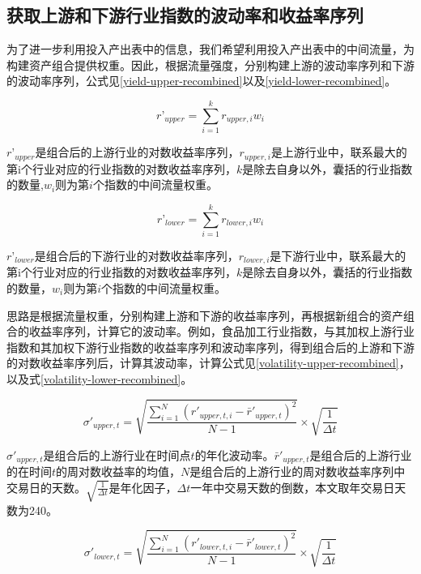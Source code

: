 \documentclass{sysuthesis}
\begin{document}
\subsection{获取上游和下游行业指数的波动率和收益率序列}
为了进一步利用投入产出表中的信息，我们希望利用投入产出表中的中间流量，为构建资产组合提供权重。因此，根据流量强度，分别构建上游的波动率序列和下游的波动率序列，公式见\ref{yield-upper-recombined}以及\ref{yield-lower-recombined}。

\begin{equation}
\label{yield-upper-recombined} 
{r’_{upper}} = \sum\limits_{i = 1}^k {{r_{upper,i}}{w_i}} 
\end{equation}

${r’_{upper}}$是组合后的上游行业的对数收益率序列，${r_{upper,i}}$是上游行业中，联系最大的第i个行业对应的行业指数的对数收益率序列，$k$是除去自身以外，囊括的行业指数的数量,${w_i}$则为第$i$个指数的中间流量权重。

\begin{equation}
\label{yield-lower-recombined} 
{r’_{lower}} = \sum\limits_{i = 1}^k {{r_{lower,i}}{w_i}} 
\end{equation}

${r’_{lower}}$是组合后的下游行业的对数收益率序列，${r_{lower,i}}$是下游行业中，联系最大的第i个行业对应的行业指数的对数收益率序列，$k$是除去自身以外，囊括的行业指数的数量，${w_i}$则为第$i$个指数的中间流量权重。

思路是根据流量权重，分别构建上游和下游的收益率序列，再根据新组合的资产组合的收益率序列，计算它的波动率。例如，食品加工行业指数，与其加权上游行业指数和其加权下游行业指数的收益率序列和波动率序列，得到组合后的上游和下游的对数收益率序列后，计算其波动率，计算公式见\ref{volatility-upper-recombined}，以及式\ref{volatility-lower-recombined}。

\begin{equation}
\label{volatility-upper-recombined} 
{\sigma '_{upper,t}} = \sqrt {\frac{{\sum\limits_{i = 1}^N {{{({{r'}_{upper,t,i}} - {{\bar r'}_{upper,t}})}^2}} }}{{N - 1}}}  \times \sqrt {\frac{1}{{\Delta t}}} 
\end{equation}

${\sigma '_{upper,t}} $是组合后的上游行业在时间点$t$的年化波动率。${{\bar r'}_{upper,t}}$是组合后的上游行业的在时间$t$的周对数收益率的均值，$N$是组合后的上游行业的周对数收益率序列中交易日的天数。$\sqrt {\frac{1}{{\Delta t}}}$是年化因子，${\Delta t}$一年中交易天数的倒数，本文取年交易日天数为240。

\begin{equation}
\label{volatility-lower-recombined} 
{\sigma '_{lower,t}} = \sqrt {\frac{{\sum\limits_{i = 1}^N {{{({{r'}_{lower,t,i}} - {{\bar r'}_{lower,t}})}^2}} }}{{N - 1}}}  \times \sqrt {\frac{1}{{\Delta t}}} 
\end{equation}
\end{document}
